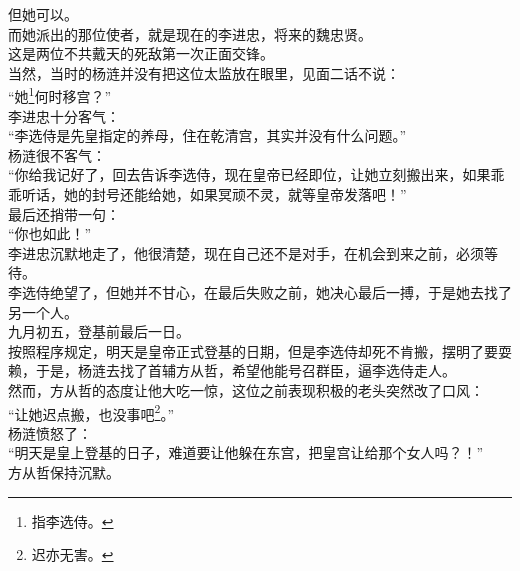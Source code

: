 \begin{multicols}{\theparacolNo}
但她可以。\\

而她派出的那位使者，就是现在的李进忠，将来的魏忠贤。\\

这是两位不共戴天的死敌第一次正面交锋。\\

当然，当时的杨涟并没有把这位太监放在眼里，见面二话不说：\\

“她\footnote{指李选侍。}何时移宫？”\\

李进忠十分客气：\\

“李选侍是先皇指定的养母，住在乾清宫，其实并没有什么问题。”\\

杨涟很不客气：\\

“你给我记好了，回去告诉李选侍，现在皇帝已经即位，让她立刻搬出来，如果乖乖听话，她的封号还能给她，如果冥顽不灵，就等皇帝发落吧！”\\

最后还捎带一句：\\

“你也如此！”\\

李进忠沉默地走了，他很清楚，现在自己还不是对手，在机会到来之前，必须等待。\\

李选侍绝望了，但她并不甘心，在最后失败之前，她决心最后一搏，于是她去找了另一个人。\\

九月初五，登基前最后一日。\\

按照程序规定，明天是皇帝正式登基的日期，但是李选侍却死不肯搬，摆明了要耍赖，于是，杨涟去找了首辅方从哲，希望他能号召群臣，逼李选侍走人。\\

然而，方从哲的态度让他大吃一惊，这位之前表现积极的老头突然改了口风：\\

“让她迟点搬，也没事吧\footnote{迟亦无害。}。”\\

杨涟愤怒了：\\

“明天是皇上登基的日子，难道要让他躲在东宫，把皇宫让给那个女人吗？！”\\

方从哲保持沉默。\\


\end{multicols}

